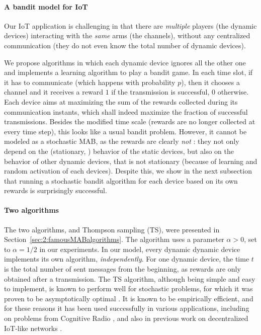 \paragraph{A bandit model for IoT}

Our IoT application is challenging in that there are \emph{multiple} players (the dynamic devices) interacting with the \emph{same} arms (the channels), without any centralized communication (they do not even know the total number of dynamic devices).

We propose algorithms in which each dynamic device ignores all the other one and
implements a learning algorithm to play a bandit game.
%
In each time slot, if it has to communicate (which happens with probability $p$), then it chooses a channel and it receives a reward $1$ if the transmission is successful, $0$ otherwise.
Each device aims at maximizing the sum of the rewards collected during its communication instants, which shall indeed maximize the fraction of successful transmissions. Besides the modified time scale (rewards are no longer collected at every time step), this looks like a usual bandit problem.
However, it cannot be modeled as a stochastic MAB, as the rewards are clearly \emph{not} \iid: they not only depend on the (stationary, \iid) behavior of the static devices, but also on the behavior of other dynamic devices, that is not stationary (because of learning and random activation of each devices).
%
Despite this, we show in the next subsection that running a stochastic bandit algorithm for each device based on its own rewards is surprisingly successful.

\paragraph{Two algorithms}

The two algorithms, \UCB{} and Thompson sampling (TS), were presented in Section~\ref{sec:2:famousMABalgorithms}.
The \UCB{} algorithm uses a parameter $\alpha > 0$, set to $\alpha = 1/2$ in our experiments.
%
In our model, every dynamic dynamic device implements its own \UCB{} algorithm, \emph{independently}.
For one dynamic device, the time $t$ is the total number of sent messages from the beginning, as rewards are only obtained after a transmission.
%
The TS algorithm, although being simple and easy to implement, is known to perform well for stochastic problems, for which it was proven to be asymptotically optimal \cite{AgrawalGoyal11,Kaufmann12Thompson}.
It is known to be empirically efficient, and for these reasons it has been used successfully in various applications, including on problems from Cognitive Radio \cite{Toldov16,Mitton16}, and also in previous work on decentralized IoT-like networks \cite{Darak16}.


